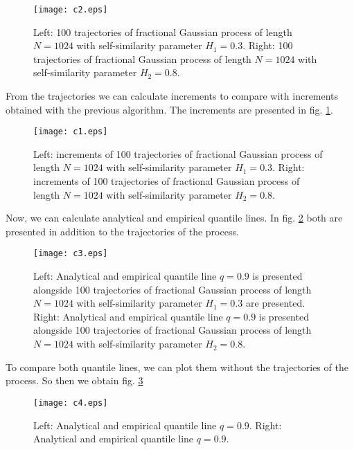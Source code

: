 \documentclass[12pt,titlepage]{article}
\begin{document}
\begin{figure}[H]
  
  \centering
    \texttt{[image: c2.eps]}
  \caption{\footnotesize 
  Left: 100 trajectories of fractional Gaussian process of length $N=1024$ with self-similarity parameter $H_1=0.3$.
  Right: 100 trajectories of fractional Gaussian process of length $N=1024$ with self-similarity parameter $H_2=0.8$.
  }
  \label{c2}
\end{figure}

From the trajectories we can calculate increments to compare with increments obtained with the previous algorithm. The increments are presented in fig. \ref{c2}.

\begin{figure}[H]
  \centering
    \texttt{[image: c1.eps]}
  \caption{\footnotesize 
  Left: increments of 100 trajectories of fractional Gaussian process of length $N=1024$ with self-similarity parameter $H_1=0.3$.
  Right: increments of 100 trajectories of fractional Gaussian process of length $N=1024$ with self-similarity parameter $H_2=0.8$.
  }
\end{figure}


Now, we can calculate analytical and empirical quantile lines. In fig. \ref{c3} both are presented in addition to the trajectories of the process.

\begin{figure}[H]
  
  \centering
    \texttt{[image: c3.eps]}
  \caption{\footnotesize 
  Left: Analytical and empirical quantile line $q=0.9$ is presented alongside 
  100 trajectories of fractional Gaussian process of length $N=1024$ with self-similarity parameter $H_1=0.3$ are presented.
  Right: Analytical and empirical quantile line $q=0.9$ is presented alongside 
  100 trajectories of fractional Gaussian process of length $N=1024$ with self-similarity parameter $H_2=0.8$.
  }
  \label{c3}
\end{figure}

To compare both quantile lines, we can plot them without the trajectories of the process. So then we obtain fig. \ref{c4}

\begin{figure}[H]
  
  \centering
    \texttt{[image: c4.eps]}
  \caption{\footnotesize 
  Left: Analytical and empirical quantile line $q=0.9$.
  Right: Analytical and empirical quantile line $q=0.9$.
  }
  \label{c4}
\end{figure}
\end{document}
